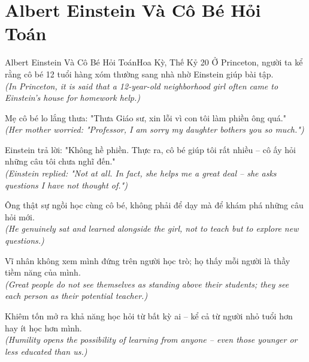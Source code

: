 \section{Albert Einstein Và Cô Bé Hỏi Toán}
\begin{truyen}{Albert Einstein Và Cô Bé Hỏi Toán}{Hoa Kỳ, Thế Kỷ 20}
Ở Princeton, người ta kể rằng cô bé 12 tuổi hàng xóm thường sang nhà nhờ Einstein giúp bài tập.\\
\textit{(In Princeton, it is said that a 12-year-old neighborhood girl often came to Einstein's house for homework help.)}

Mẹ cô bé lo lắng thưa: "Thưa Giáo sư, xin lỗi vì con tôi làm phiền ông quá."\\
\textit{(Her mother worried: "Professor, I am sorry my daughter bothers you so much.")}

Einstein trả lời: "Không hề phiền. Thực ra, cô bé giúp tôi rất nhiều -- cô ấy hỏi những câu tôi chưa nghĩ đến."\\
\textit{(Einstein replied: "Not at all. In fact, she helps me a great deal -- she asks questions I have not thought of.")}

Ông thật sự ngồi học cùng cô bé, không phải để dạy mà để khám phá những câu hỏi mới.\\
\textit{(He genuinely sat and learned alongside the girl, not to teach but to explore new questions.)}

Vĩ nhân không xem mình đứng trên người học trò; họ thấy mỗi người là thầy tiềm năng của mình.\\
\textit{(Great people do not see themselves as standing above their students; they see each person as their potential teacher.)}

\end{truyen}
\begin{baihoc}
  Khiêm tốn mở ra khả năng học hỏi từ bất kỳ ai -- kể cả từ người nhỏ tuổi hơn hay ít học hơn mình.\\
  \textit{(Humility opens the possibility of learning from anyone -- even those younger or less educated than us.)}
\end{baihoc}

